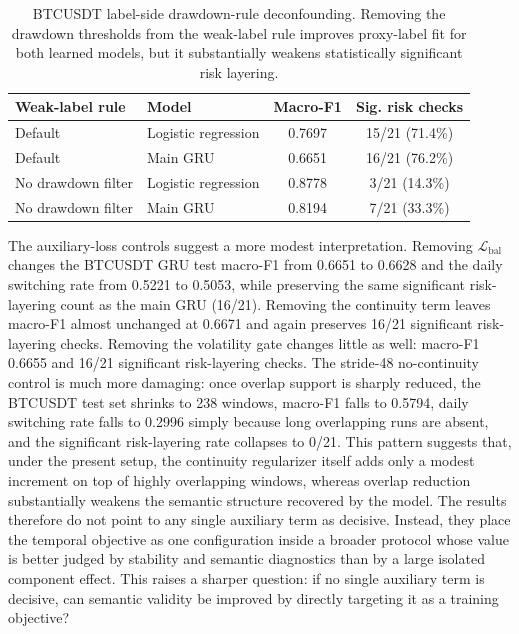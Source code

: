 \documentclass[a4paper,fleqn]{cas-dc}
\begin{document}
\begin{table}[t]
\caption{BTCUSDT label-side drawdown-rule deconfounding. Removing the drawdown thresholds from the weak-label rule improves proxy-label fit for both learned models, but it substantially weakens statistically significant risk layering.}
\label{tab:drawdown-rule-deconfounding}
\centering
\scriptsize
\setlength{\tabcolsep}{5pt}
\begin{tabular}{llcc}
\toprule
Weak-label rule & Model & Macro-F1 & Sig. risk checks \\
\midrule
Default & Logistic regression & 0.7697 & 15/21 (71.4\%) \\
Default & Main GRU & 0.6651 & 16/21 (76.2\%) \\
No drawdown filter & Logistic regression & 0.8778 & 3/21 (14.3\%) \\
No drawdown filter & Main GRU & 0.8194 & 7/21 (33.3\%) \\
\bottomrule
\end{tabular}
\end{table}

The auxiliary-loss controls suggest a more modest interpretation. Removing $\mathcal{L}_{\mathrm{bal}}$ changes the BTCUSDT GRU test macro-F1 from 0.6651 to 0.6628 and the daily switching rate from 0.5221 to 0.5053, while preserving the same significant risk-layering count as the main GRU (16/21). Removing the continuity term leaves macro-F1 almost unchanged at 0.6671 and again preserves 16/21 significant risk-layering checks. Removing the volatility gate changes little as well: macro-F1 0.6655 and 16/21 significant risk-layering checks. The stride-48 no-continuity control is much more damaging: once overlap support is sharply reduced, the BTCUSDT test set shrinks to 238 windows, macro-F1 falls to 0.5794, daily switching rate falls to 0.2996 simply because long overlapping runs are absent, and the significant risk-layering rate collapses to 0/21. This pattern suggests that, under the present setup, the continuity regularizer itself adds only a modest increment on top of highly overlapping windows, whereas overlap reduction substantially weakens the semantic structure recovered by the model. The results therefore do not point to any single auxiliary term as decisive. Instead, they place the temporal objective as one configuration inside a broader protocol whose value is better judged by stability and semantic diagnostics than by a large isolated component effect. This raises a sharper question: if no single auxiliary term is decisive, can semantic validity be improved by directly targeting it as a training objective?
\end{document}
